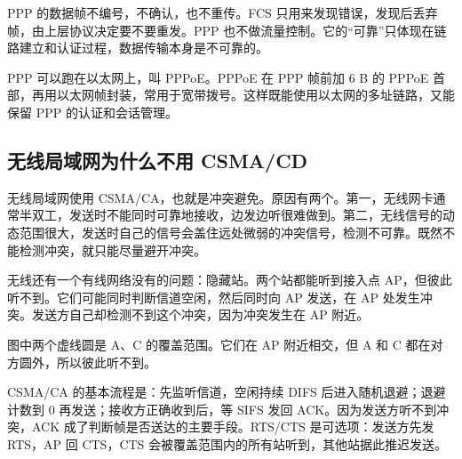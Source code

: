 PPP 的数据帧不编号，不确认，也不重传。FCS 只用来发现错误，发现后丢弃帧，由上层协议决定要不要重发。PPP 也不做流量控制。它的“可靠”只体现在链路建立和认证过程，数据传输本身是不可靠的。

PPP 可以跑在以太网上，叫 PPPoE。PPPoE 在 PPP 帧前加 6 B 的 PPPoE 首部，再用以太网帧封装，常用于宽带拨号。这样既能使用以太网的多址链路，又能保留 PPP 的认证和会话管理。

\subsection{无线局域网为什么不用 CSMA/CD}

无线局域网使用 CSMA/CA，也就是冲突避免。原因有两个。第一，无线网卡通常半双工，发送时不能同时可靠地接收，边发边听很难做到。第二，无线信号的动态范围很大，发送时自己的信号会盖住远处微弱的冲突信号，检测不可靠。既然不能检测冲突，就只能尽量避开冲突。

无线还有一个有线网络没有的问题：隐藏站。两个站都能听到接入点 AP，但彼此听不到。它们可能同时判断信道空闲，然后同时向 AP 发送，在 AP 处发生冲突。发送方自己却检测不到这个冲突，因为冲突发生在 AP 附近。

\begin{center}
\end{center}

图中两个虚线圆是 A、C 的覆盖范围。它们在 AP 附近相交，但 A 和 C 都在对方圆外，所以彼此听不到。

CSMA/CA 的基本流程是：先监听信道，空闲持续 DIFS 后进入随机退避；退避计数到 0 再发送；接收方正确收到后，等 SIFS 发回 ACK。因为发送方听不到冲突，ACK 成了判断帧是否送达的主要手段。RTS/CTS 是可选项：发送方先发 RTS，AP 回 CTS，CTS 会被覆盖范围内的所有站听到，其他站据此推迟发送。

